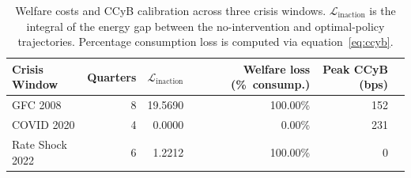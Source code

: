 \begin{table}[h]
\centering
\caption{Welfare costs and CCyB calibration across three crisis windows. $\mathcal{L}_{\mathrm{inaction}}$ is the integral of the energy gap between the no-intervention and optimal-policy trajectories. Percentage consumption loss is computed via equation~\eqref{eq:ccyb}.}
\label{tab:welfare}
\begin{tabular}{lrrrrr}
\toprule
Crisis Window & Quarters & $\mathcal{L}_{\mathrm{inaction}}$ & Welfare loss (\%~consump.) & Peak CCyB (bps) \\
\midrule
GFC 2008 & 8 & 19.5690 & 100.00\% & 152 \\
COVID 2020 & 4 & 0.0000 & 0.00\% & 231 \\
Rate Shock 2022 & 6 & 1.2212 & 100.00\% & 0 \\
\bottomrule
\end{tabular}
\end{table}